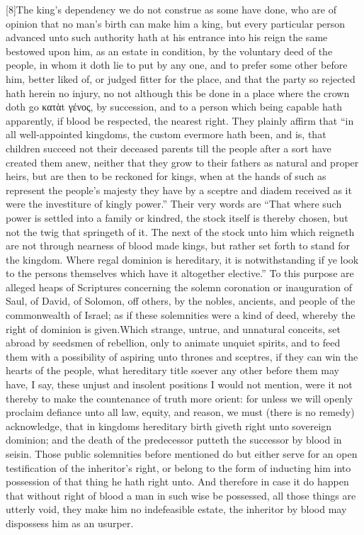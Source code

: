 [8]The king’s dependency we do not construe as some have done, who are of opinion that no man’s birth can make him a king, but every particular person advanced unto such authority hath at his entrance into his reign the same bestowed upon him, as an estate in condition, by the voluntary deed of the people, in whom it doth lie to put by any one, and to prefer some other before him, better liked of, or judged fitter for the place, and that the party so rejected hath herein no injury, no not although this be done in a place where the crown doth go κατὰt γένος, by succession, and to a person which being capable hath apparently, if blood be respected, the nearest right. They plainly affirm that “in all well-appointed  kingdoms, the custom evermore hath been, and is, that children succeed not their deceased parents till the people after a sort have created them anew, neither that they grow to their fathers as natural and proper heirs, but are then to be reckoned for kings, when at the hands of such as represent the people’s majesty they have by a sceptre and diadem received as it were the investiture of kingly power.” Their very words are “That where such power is settled into a family or kindred, the stock itself is thereby chosen, but not the twig that springeth of it. The next of the stock unto him which reigneth are not through nearness of blood made kings, but rather set forth to stand for the kingdom. Where regal dominion is hereditary, it is notwithstanding if ye look to the persons themselves which have it altogether elective.” To this purpose are alleged heaps of Scriptures concerning the solemn coronation or inauguration of Saul, of David, of Solomon, off others, by the nobles, ancients, and people of the commonwealth of Israel; as if these solemnities were a kind of deed, whereby the right of dominion is given.Which strange, untrue, and unnatural conceits, set abroad by seedsmen of rebellion, only to animate unquiet spirits, and to feed them with a possibility of aspiring  unto thrones and sceptres, if they can win the hearts of the people, what hereditary title soever any other before them may have, I say, these unjust and insolent positions I would not mention, were it not thereby to make the countenance of truth more orient: for unless we will openly proclaim defiance unto all law, equity, and reason, we must (there is no remedy) acknowledge, that in kingdoms hereditary birth giveth right unto sovereign dominion; and the death of the predecessor putteth the successor by blood in seisin. Those public solemnities before mentioned do but either serve for an open testification of the inheritor’s right, or belong to the form of inducting him into possession of that thing he hath right unto. And therefore in case it do happen that without right of blood a man in such wise be possessed, all those things are utterly void, they make him no indefeasible estate, the inheritor by blood may dispossess him as an usurper.

